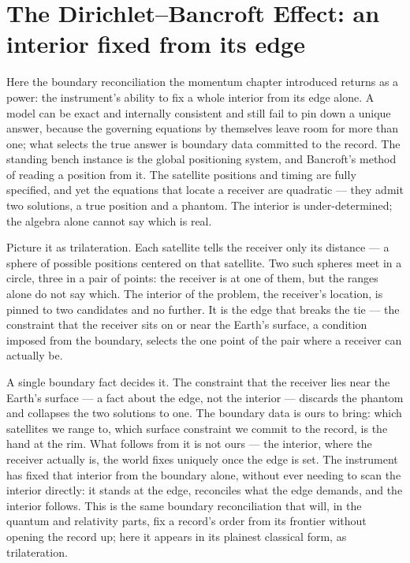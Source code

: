 \section{The Dirichlet--Bancroft Effect: an interior fixed from its edge}
\label{se:dirichlet-bancroft}

Here the boundary reconciliation the momentum chapter introduced returns as a power: the instrument's ability
to fix a whole interior from its edge alone. A model can be exact and internally consistent and still fail to
pin down a unique answer, because the governing equations by themselves leave room for more than one; what
selects the true answer is boundary data committed to the record. The standing bench instance is the global
positioning system, and Bancroft's method of reading a position from it. The satellite positions and timing
are fully specified, and yet the equations that locate a receiver are quadratic --- they admit two solutions,
a true position and a phantom. The interior is under-determined; the algebra alone cannot say which is real.

Picture it as trilateration. Each satellite tells the receiver only its distance --- a sphere of possible
positions centered on that satellite. Two such spheres meet in a circle, three in a pair of points: the
receiver is at one of them, but the ranges alone do not say which. The interior of the problem, the
receiver's location, is pinned to two candidates and no further. It is the edge that breaks the tie --- the
constraint that the receiver sits on or near the Earth's surface, a condition imposed from the boundary,
selects the one point of the pair where a receiver can actually be.

A single boundary fact decides it. The constraint that the receiver lies near the Earth's surface --- a fact
about the edge, not the interior --- discards the phantom and collapses the two solutions to one. The boundary
data is ours to bring: which satellites we range to, which surface constraint we commit to the record, is the
hand at the rim. What follows from it is not ours --- the interior, where the receiver actually is, the world
fixes uniquely once the edge is set. The instrument has fixed that interior from the boundary alone, without
ever needing to scan the interior directly: it stands at the edge, reconciles what the edge demands, and the
interior follows. This is the same boundary reconciliation that will, in the quantum and relativity parts, fix
a record's order from its frontier without opening the record up; here it appears in its plainest classical
form, as trilateration.

